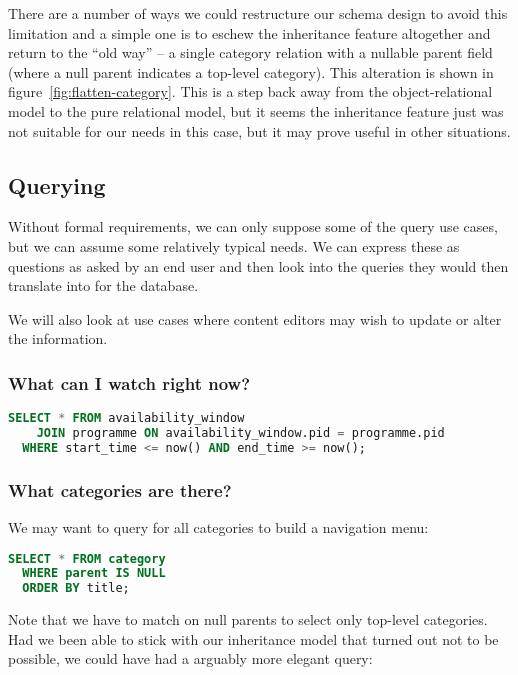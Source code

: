 \documentclass[11pt,a4paper]{article}
\begin{document}
There are a number of ways we could restructure our schema design to
avoid this limitation and a simple one is to eschew the inheritance feature
altogether and return to the ``old way'' -- a single category relation
with a nullable parent field (where a null parent indicates a top-level
category). This alteration is shown in figure~\ref{fig:flatten-category}.
This is a step back away from the object-relational model to the pure
relational model, but it seems the inheritance feature just was not
suitable for our needs in this case, but it may prove useful in other
situations.

\subsection{Querying}

Without formal requirements, we can only
suppose some of the query use cases, but we can assume some relatively typical
needs. We can express these as questions as asked by an end user and then
look into the queries they would then translate into for the database.

We will also look at use cases where content editors may wish to update
or alter the information.

\subsubsection{What can I watch right now?}

\begin{lstlisting}[language=SQL]
  SELECT * FROM availability_window
    JOIN programme ON availability_window.pid = programme.pid
  WHERE start_time <= now() AND end_time >= now();
\end{lstlisting}

\subsubsection{What categories are there?}

We may want to query for all categories to build a navigation menu:

\begin{lstlisting}[language=SQL]
  SELECT * FROM category
  WHERE parent IS NULL
  ORDER BY title;
\end{lstlisting}

Note that we have to match on null parents to select only
top-level categories. Had
we been able to stick with our inheritance model that turned out
not to be possible, we could have had a arguably more elegant
query:
\end{document}
